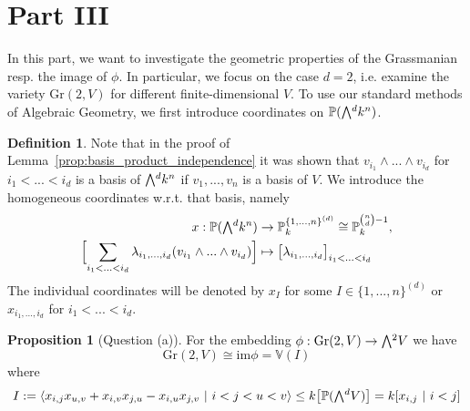 \documentclass{scrartcl}
\newcommand{\V}{\mathbb{V}}
\newcommand{\Proj}{\mathbb{P}}
\newcommand{\Gr}{\mathrm{Gr}}
\newcommand{\extpow}{\mathchoice{{\textstyle\bigwedge}}
    {{\bigwedge}}
    {{\textstyle\wedge}}
    {{\scriptstyle\wedge}}}
\theoremstyle{definition}
\newtheorem{definition}[subsection]{Definition}
\newtheorem{proposition}[subsection]{Proposition}
\begin{document}
\section{Part III}
In this part, we want to investigate the geometric properties of the Grassmanian resp. the image of $\phi$.
In particular, we focus on the case $d = 2$, i.e. examine the variety $\Gr(2, V)$ for different finite-dimensional $V$.
To use our standard methods of Algebraic Geometry, we first introduce coordinates on $\Proj(\extpow^d k^n)$.
\begin{definition}
    Note that in the proof of Lemma~\ref{prop:basis_product_independence} it was shown that $v_{i_1} \wedge ... \wedge v_{i_d}$ for $i_1 < ... < i_d$ is a basis of $\extpow^d k^n$ if $v_1, ..., v_n$ is a basis of $V$.
    We introduce the homogeneous coordinates w.r.t. that basis, namely
    \begin{align*}
        x: \Proj(\extpow^d k^n) &\to \Proj_k^{\{1, ..., n\}^{(d)}} \cong \Proj_k^{{n \choose d} - 1}, \\
        \Bigl[ \sum_{i_1 < ... < i_d} \lambda_{i_1, ..., i_d} (v_{i_1} \wedge ... \wedge v_{i_d}) \Bigr] &\mapsto \bigl[ \lambda_{i_1, ..., i_d} \bigr]_{i_1 < ... < i_d}
    \end{align*}
    The individual coordinates will be denoted by $x_I$ for some $I \in \{1, ..., n\}^{(d)}$ or $x_{i_1, ..., i_d}$ for $i_1 < ... < i_d$.
\end{definition}
\begin{proposition}[Question (a)]
    \label{prop:equations_grassmanian_2}
    For the embedding $\phi: \Gr(2, V) \to \extpow^2 V$ we have
    \begin{equation*}
        \Gr(2, V) \cong \mathrm{im}\phi = \V(I)
    \end{equation*}
    where
    \begin{equation*}
        I := \langle x_{i, j}x_{u, v} + x_{i, v}x_{j, u} - x_{i, u}x_{j, v} \ | \ i < j < u < v \rangle \leq k\bigl[\Proj(\extpow^d V)\bigr] = k[x_{i, j} \ | \ i < j]
    \end{equation*}
\end{proposition}
\end{document}
